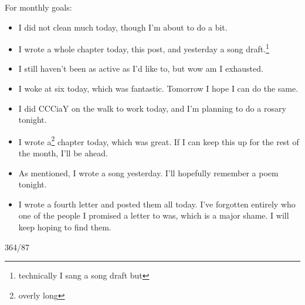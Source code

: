 \documentclass[12pt]{article}[titlepage]
\newcommand{\1}{\={a}}
\newcommand{\2}{\={e}}
\newcommand{\3}{\={\i}}
\newcommand{\4}{\=o}
\newcommand{\5}{\=u}
\newcommand{\6}{\={A}}
\renewcommand{\,}{\textsuperscript{,}}
\begin{document}
For monthly goals:
\begin{itemize}
\item I did not clean much today, though I'm about to do a bit.
\item I wrote a whole chapter today, this post, and yesterday a song draft.\footnote{technically I sang a song draft but}
\item I still haven't been as active as I'd like to, but wow am I exhausted.
\item I woke at six today, which was fantastic. Tomorrow I hope I can do the same.
\item I did CCCiaY on the walk to work today, and I'm planning to do a rosary tonight.
\item I wrote a\footnote{overly long} chapter today, which was great. If I can keep this up for the rest of the month, I'll be ahead.
\item As mentioned, I wrote a song yesterday. I'll hopefully remember a poem tonight.
\item I wrote a fourth letter and posted them all today. I've forgotten entirely who one of the people I promised a letter to was, which is a major shame. I will keep hoping to find them.
\end{itemize}

364/87
\end{document}
